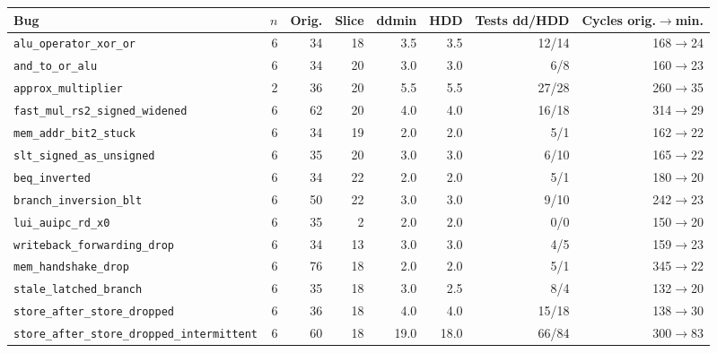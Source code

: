 \begin{tabular}{@{}l r r r r r r r@{}}\toprule
Bug & $n$ & Orig. & Slice & ddmin & HDD & Tests dd/HDD & Cycles orig.$\rightarrow$min.\\\midrule
\texttt{alu\_operator\_xor\_or} & 6 & 34 & 18 & 3.5 & 3.5 & 12/14 & 168$\rightarrow$24\\
\texttt{and\_to\_or\_alu} & 6 & 34 & 20 & 3.0 & 3.0 & 6/8 & 160$\rightarrow$23\\
\texttt{approx\_multiplier} & 2 & 36 & 20 & 5.5 & 5.5 & 27/28 & 260$\rightarrow$35\\
\texttt{fast\_mul\_rs2\_signed\_widened} & 6 & 62 & 20 & 4.0 & 4.0 & 16/18 & 314$\rightarrow$29\\
\texttt{mem\_addr\_bit2\_stuck} & 6 & 34 & 19 & 2.0 & 2.0 & 5/1 & 162$\rightarrow$22\\
\texttt{slt\_signed\_as\_unsigned} & 6 & 35 & 20 & 3.0 & 3.0 & 6/10 & 165$\rightarrow$22\\
\texttt{beq\_inverted} & 6 & 34 & 22 & 2.0 & 2.0 & 5/1 & 180$\rightarrow$20\\
\texttt{branch\_inversion\_blt} & 6 & 50 & 22 & 3.0 & 3.0 & 9/10 & 242$\rightarrow$23\\
\texttt{lui\_auipc\_rd\_x0} & 6 & 35 & 2 & 2.0 & 2.0 & 0/0 & 150$\rightarrow$20\\
\texttt{writeback\_forwarding\_drop} & 6 & 34 & 13 & 3.0 & 3.0 & 4/5 & 159$\rightarrow$23\\
\texttt{mem\_handshake\_drop} & 6 & 76 & 18 & 2.0 & 2.0 & 5/1 & 345$\rightarrow$22\\
\texttt{stale\_latched\_branch} & 6 & 35 & 18 & 3.0 & 2.5 & 8/4 & 132$\rightarrow$20\\
\texttt{store\_after\_store\_dropped} & 6 & 36 & 18 & 4.0 & 4.0 & 15/18 & 138$\rightarrow$30\\
\texttt{store\_after\_store\_dropped\_intermittent} & 6 & 60 & 18 & 19.0 & 18.0 & 66/84 & 300$\rightarrow$83\\
\bottomrule\end{tabular}